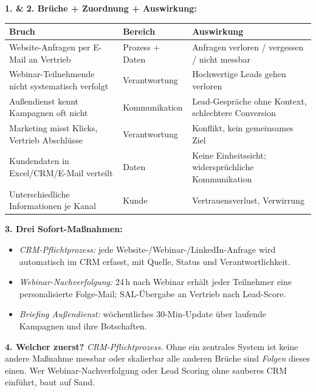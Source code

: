 \documentclass[11pt,a4paper,oneside]{article}
\begin{document}
\begin{loesungbox}
\textbf{1. \& 2. Brüche + Zuordnung + Auswirkung:}

\smallskip
\begin{tabularx}{\linewidth}{@{}lXX@{}}
\toprule
\textbf{Bruch} & \textbf{Bereich} & \textbf{Auswirkung} \\
\midrule
Website-Anfragen per E-Mail an Vertrieb         & Prozess + Daten   & Anfragen verloren / vergessen / nicht messbar \\
\midrule
Webinar-Teilnehmende nicht systematisch verfolgt & Verantwortung    & Hochwertige Leads gehen verloren \\
\midrule
Außendienst kennt Kampagnen oft nicht           & Kommunikation     & Lead-Gespräche ohne Kontext, schlechtere Conversion \\
\midrule
Marketing misst Klicks, Vertrieb Abschlüsse     & Verantwortung    & Konflikt, kein gemeinsames Ziel \\
\midrule
Kundendaten in Excel/CRM/E-Mail verteilt        & Daten            & Keine Einheitssicht; widersprüchliche Kommunikation \\
\midrule
Unterschiedliche Informationen je Kanal         & Kunde            & Vertrauensverlust, Verwirrung \\
\bottomrule
\end{tabularx}

\smallskip
\textbf{3. Drei Sofort-Maßnahmen:}
\begin{itemize}
  \item \emph{CRM-Pflichtprozess:} jede Website-/Webinar-/LinkedIn-Anfrage wird automatisch im CRM erfasst, mit Quelle, Status und Verantwortlichkeit.
  \item \emph{Webinar-Nachverfolgung:} 24\,h nach Webinar erhält jeder Teilnehmer eine personalisierte Folge-Mail; SAL-Übergabe an Vertrieb nach Lead-Score.
  \item \emph{Briefing Außendienst:} wöchentliches 30-Min-Update über laufende Kampagnen und ihre Botschaften.
\end{itemize}

\textbf{4. Welcher zuerst?}
\emph{CRM-Pflichtprozess.} Ohne ein zentrales System ist keine andere Maßnahme messbar oder skalierbar \textendash{} alle anderen Brüche sind \emph{Folgen} dieses einen. Wer Webinar-Nachverfolgung oder Lead Scoring ohne sauberes CRM einführt, baut auf Sand.
\end{loesungbox}

\clearpage
\end{document}
